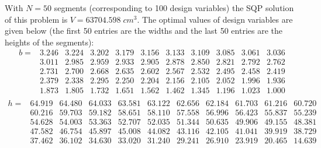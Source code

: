 \documentclass[runningheads,a4paper]{llncs}
\begin{document}
With $N=50$ segments (corresponding to 100 design variables) the SQP solution of this problem is $V = 63704.598\; cm^3$. The optimal values of design variables are given below (the first 50 entries are the widths and the last 50 entries are the heights of the segments):
\setcounter{MaxMatrixCols}{11}
\[
\begin{matrix}%
			b=& 3.246& 3.224& 3.202& 3.179& 3.156& 3.133& 3.109& 3.085& 3.061& 3.036 \\  
			  & 3.011& 2.985& 2.959& 2.933& 2.905& 2.878& 2.850& 2.821& 2.792& 2.762 \\
			  & 2.731& 2.700& 2.668& 2.635& 2.602& 2.567& 2.532& 2.495& 2.458& 2.419 \\  
			  & 2.379& 2.338& 2.295& 2.250& 2.204& 2.156& 2.105& 2.052& 1.996& 1.936 \\  
			  & 1.873& 1.805& 1.732& 1.651& 1.562& 1.462& 1.345& 1.196& 1.023& 1.000 \\ 	
\end{matrix}
\]
\[
\begin{matrix}
	h=& 64.919&64.480&64.033&63.581&63.122&62.656&62.184&61.703&61.216&60.720  \\
		& 60.216&59.703&59.182&58.651&58.110&57.558&56.996&56.423&55.837&55.239  \\
		& 54.628&54.003&53.363&52.707&52.035&51.344&50.635&49.906&49.155&48.381  \\
		& 47.582&46.754&45.897&45.008&44.082&43.116&42.105&41.041&39.919&38.729  \\
		& 37.462&36.102&34.630&33.020&31.240&29.241&26.910&23.919&20.465&14.639  \\
\end{matrix}
\]
\end{document}
